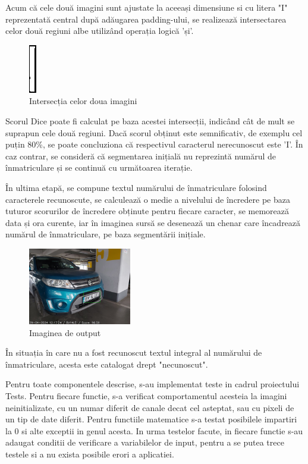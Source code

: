 \documentclass[a4paper,12pt]{report}
\begin{document}
Acum că cele două imagini sunt ajustate la aceeași dimensiune si cu litera "I" reprezentată central după adăugarea padding-ului, se realizează intersectarea celor două regiuni albe utilizând operația logică 'și'.

\begin{figure}[h!]
    \centering
    \includegraphics[height=0.2\textwidth]{images/intersection.jpg}
    \caption{Intersecția celor doua imagini}
\end{figure}
\FloatBarrier

Scorul Dice poate fi calculat pe baza acestei intersecții, indicând cât de mult se suprapun cele două regiuni. Dacă scorul obținut este semnificativ, de exemplu cel puțin 80\%, se poate concluziona că respectivul caracterul nerecunoscut este 'I'. În caz contrar, se consideră că segmentarea inițială nu reprezintă numărul de înmatriculare și se continuă cu următoarea iterație.

În ultima etapă, se compune textul numărului de înmatriculare folosind caracterele recunoscute, se calculează o medie a nivelului de încredere pe baza tuturor scorurilor de încredere obținute pentru fiecare caracter, se memorează data și ora curente, iar în imaginea sursă se desenează un chenar care încadrează numărul de înmatriculare, pe baza segmentării inițiale.

\begin{figure}[h!]
    \centering
    \includegraphics[width=0.4\textwidth]{images/output.jpg}
    \caption{Imaginea de output}
\end{figure}
\FloatBarrier

În situația în care nu a fost recunoscut textul integral al numărului de înmatriculare, acesta este catalogat drept "necunoscut".

Pentru toate componentele descrise, s-au implementat teste in cadrul proiectului Tests. Pentru fiecare functie, s-a verificat comportamentul acesteia la imagini neinitializate, cu un numar diferit de canale decat cel asteptat, sau cu pixeli de un tip de date diferit. Pentru functiile matematice s-a testat posibilele impartiri la 0 si alte exceptii in genul acesta. In urma testelor facute, in fiecare functie s-au adaugat conditii de verificare a variabilelor de input, pentru a se putea trece testele si a nu exista posibile erori a aplicatiei.
\end{document}
